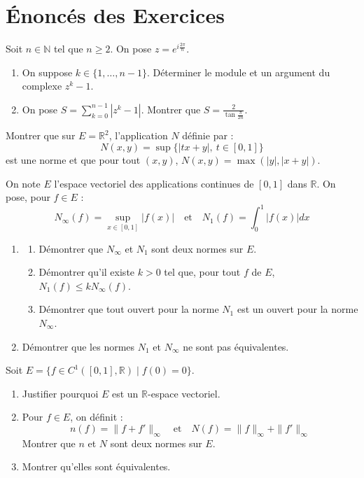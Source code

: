 \section{Énoncés des Exercices}

\begin{exercice}
Soit $n \in \mathbb{N}$ tel que $n \ge 2$. On pose $z = e^{i\frac{2\pi}{n}}$.
\begin{enumerate}
    \item On suppose $k \in \{1, \dots, n-1\}$. Déterminer le module et un argument du complexe $z^k - 1$.
    \item On pose $S = \sum_{k=0}^{n-1} |z^k - 1|$. Montrer que $S = \frac{2}{\tan \frac{\pi}{2n}}$.
\end{enumerate}
\end{exercice}

\begin{exercice}
Montrer que sur $E = \mathbb{R}^2$, l'application $N$ définie par :
$$ N(x,y) = \sup \{ |tx+y|, \ t \in [0,1] \} $$
est une norme et que pour tout $(x,y)$, $N(x,y) = \max(|y|, |x+y|)$.
\end{exercice}

\begin{exercice}
On note $E$ l'espace vectoriel des applications continues de $[0,1]$ dans $\mathbb{R}$.
On pose, pour $f \in E$ :
$$ N_\infty(f) = \sup_{x \in [0,1]} |f(x)| \quad \text{et} \quad N_1(f) = \int_0^1 |f(x)| dx $$
\begin{enumerate}
    \item 
    \begin{enumerate}
        \item Démontrer que $N_\infty$ et $N_1$ sont deux normes sur $E$.
        \item Démontrer qu'il existe $k > 0$ tel que, pour tout $f$ de $E$, $N_1(f) \le k N_\infty(f)$.
        \item Démontrer que tout ouvert pour la norme $N_1$ est un ouvert pour la norme $N_\infty$.
    \end{enumerate}
    \item Démontrer que les normes $N_1$ et $N_\infty$ ne sont pas équivalentes.
\end{enumerate}
\end{exercice}

\begin{exercice}
Soit $E = \{ f \in C^1([0,1], \mathbb{R}) \mid f(0)=0 \}$.
\begin{enumerate}
    \item Justifier pourquoi $E$ est un $\mathbb{R}$-espace vectoriel.
    \item Pour $f \in E$, on définit :
    $$ n(f) = \|f+f'\|_\infty \quad \text{et} \quad N(f) = \|f\|_\infty + \|f'\|_\infty $$
    Montrer que $n$ et $N$ sont deux normes sur $E$.
    \item Montrer qu'elles sont équivalentes.
\end{enumerate}
\end{exercice}

